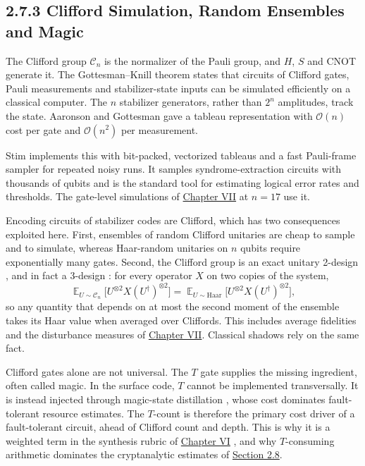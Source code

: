 \documentclass{report}
\theoremstyle{plain}
\theoremstyle{definition}
\theoremstyle{remark}
\newcommand{\bigO}[1]{\mathcal{O}\!\left(#1\right)}
\begin{document}
\subsection{2.7.3 Clifford Simulation, Random Ensembles and Magic}

The Clifford group $\mathcal{C}_n$ is the normalizer of the Pauli group, and $H$, $S$ and CNOT generate it. The Gottesman--Knill theorem states that circuits of Clifford gates, Pauli measurements and stabilizer-state inputs can be simulated efficiently on a classical computer. The $n$ stabilizer generators, rather than $2^n$ amplitudes, track the state. Aaronson and Gottesman \cite{aaronson2004stabilizer} gave a tableau representation with $\bigO{n}$ cost per gate and $\bigO{n^2}$ per measurement.

Stim \cite{gidney2021stim} implements this with bit-packed, vectorized tableaus and a fast Pauli-frame sampler for repeated noisy runs. It samples syndrome-extraction circuits with thousands of qubits and is the standard tool for estimating logical error rates and thresholds. The gate-level simulations of \hyperref[ch:qec]{Chapter VII} at $n=17$ use it.

Encoding circuits of stabilizer codes are Clifford, which has two consequences exploited here. First, ensembles of random Clifford unitaries are cheap to sample and to simulate, whereas Haar-random unitaries on $n$ qubits require exponentially many gates. Second, the Clifford group is an exact unitary 2-design \cite{dankert2009designs}, and in fact a 3-design \cite{webb2016clifford3design}: for every operator $X$ on two copies of the system,
\hypertarget{eq:bg:design}{}\[
\mathop{\mathbb{E}}_{U\sim\mathcal{C}_n}\bigl[U^{\otimes2}X(U^{\dagger})^{\otimes2}\bigr]=\mathop{\mathbb{E}}_{U\sim\mathrm{Haar}}\bigl[U^{\otimes2}X(U^{\dagger})^{\otimes2}\bigr],
\tag{2.11}\]
so any quantity that depends on at most the second moment of the ensemble takes its Haar value when averaged over Cliffords. This includes average fidelities and the disturbance measures of \hyperref[ch:qec]{Chapter VII}. Classical shadows \cite{huang2020shadows} rely on the same fact.

Clifford gates alone are not universal. The $T$ gate supplies the missing ingredient, often called magic. In the surface code, $T$ cannot be implemented transversally. It is instead injected through magic-state distillation \cite{bravyi2005magic}, whose cost dominates fault-tolerant resource estimates. The $T$-count is therefore the primary cost driver of a fault-tolerant circuit, ahead of Clifford count and depth. This is why it is a weighted term in the synthesis rubric of \hyperref[ch:synthesis]{Chapter VI} \cite{guo2026rubriq}, and why $T$-consuming arithmetic dominates the cryptanalytic estimates of \hyperref[sec:bg:crypto]{Section 2.8}.
\end{document}

